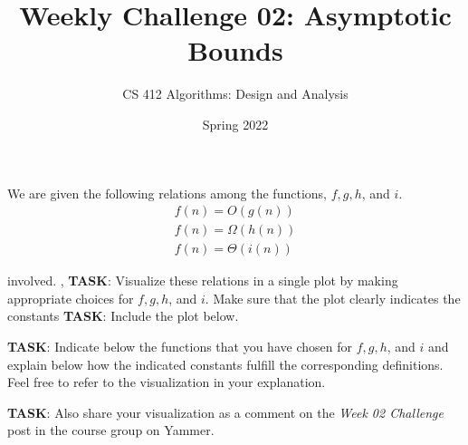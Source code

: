 \documentclass[a4paper]{exam}
\title{Weekly Challenge 02: Asymptotic Bounds}
\author{CS 412 Algorithms: Design and Analysis}
\date{Spring 2022}
\begin{document}
\maketitle

\begin{questions}
  
\question We are given the following relations among the functions, $f, g, h$, and $i$.
  \begin{align*}
    f(n) = O(g(n))\\
    f(n) = \Omega(h(n))\\
    f(n) = \Theta(i(n))
  \end{align*}



involved.
  ,  \noindent\textbf{TASK}: Visualize these relations in a single plot by making appropriate choices for $f, g, h$, and $i$. Make sure that the plot clearly indicates the constants 
  \noindent\textbf{TASK}: Include the plot below.
  
  \noindent\textbf{TASK}: Indicate below the functions that you have chosen for $f, g, h$, and $i$ and explain below how the indicated constants fulfill the corresponding definitions. Feel free to refer to the visualization in your explanation.
  
  \noindent\textbf{TASK}:  Also share your visualization as a comment on the \textit{Week 02 Challenge} post in the course group on Yammer.

  \begin{solution}
  \end{solution}


\end{questions}
\end{document}
